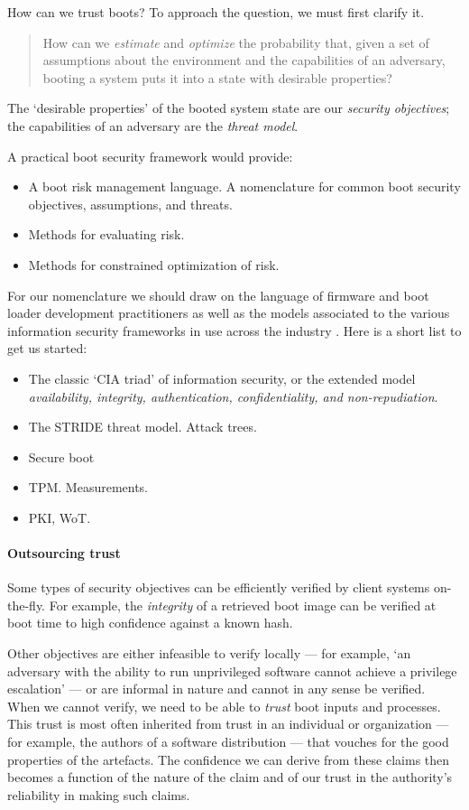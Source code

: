 How can we trust boots?
%
To approach the question, we must first clarify it.
\begin{quote}
  How can we \emph{estimate} and \emph{optimize} the probability that, given a set of assumptions about the environment and the capabilities of an adversary, booting a system puts it into a state with desirable properties?
\end{quote}
The `desirable properties' of the booted system state are our \emph{security objectives}; the capabilities of an adversary are the \emph{threat model}.

A practical boot security framework would provide:
\begin{itemize}
  \item A boot risk management language. A nomenclature for common boot security objectives, assumptions, and threats.
  \item Methods for evaluating risk.
  \item Methods for constrained optimization of risk.
\end{itemize}
For our nomenclature we should draw on the language of firmware and boot loader development practitioners \cite{yao2020building} as well as the models associated to the various information security frameworks in use across the industry \cite{taherdoost2022understanding}. 
%
Here is a short list to get us started:
\begin{itemize}
  \item The classic `CIA triad' of information security, or the extended model \emph{availability, integrity, authentication, confidentiality, and non-repudiation}.
  \item The STRIDE threat model. Attack trees.
  \item Secure boot
  \item TPM. Measurements.
  \item PKI, WoT.
\end{itemize}

\paragraph{Outsourcing trust}
Some types of security objectives can be efficiently verified by client systems on-the-fly.
%
For example, the \emph{integrity} of a retrieved boot image can be verified at boot time to high confidence against a known hash.

Other objectives are either infeasible to verify locally --- for example, `an adversary with the ability to run unprivileged software cannot achieve a privilege escalation' --- or are informal in nature and cannot in any sense be verified.
%
When we cannot verify, we need to be able to \emph{trust} boot inputs and processes.
%
This trust is most often inherited from trust in an individual or organization --- for example, the authors of a software distribution --- that vouches for the good properties of the artefacts.
%
The confidence we can derive from these claims then becomes a function of the nature of the claim and of our trust in the authority's reliability in making such claims.

